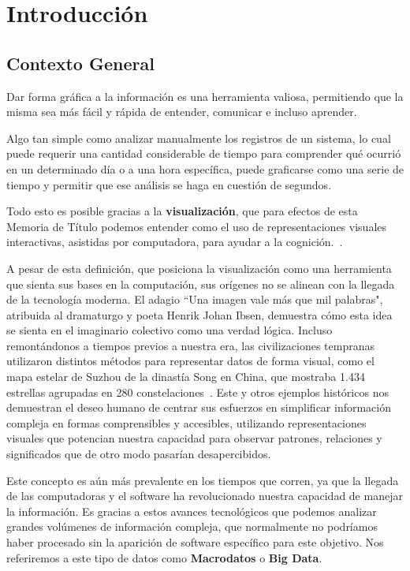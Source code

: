 \section{Introducción}
\subsection{Contexto General}

Dar forma gráfica a la información es una herramienta valiosa, permitiendo que la misma sea más fácil y rápida de entender, comunicar e incluso aprender. 

Algo tan simple como analizar manualmente los registros de un sistema, lo cual puede requerir una cantidad considerable de tiempo para comprender qué ocurrió en un determinado día o a una hora específica, puede graficarse como una serie de tiempo y permitir que ese análisis se haga en cuestión de segundos.

Todo esto es posible gracias a la \textbf{visualización}, que para efectos de esta Memoria de Título podemos entender como el uso de representaciones visuales interactivas, asistidas por computadora, para ayudar a la cognición.~\cite{card1999readings}. 

A pesar de esta definición, que posiciona la visualización como una herramienta que sienta sus bases en la computación, sus orígenes no se alinean con la llegada de la tecnología moderna. El adagio ``Una imagen vale más que mil palabras", atribuida al dramaturgo y poeta Henrik Johan Ibsen, demuestra cómo esta idea se sienta en el imaginario colectivo como una verdad lógica. Incluso remontándonos a tiempos previos a nuestra era, las civilizaciones tempranas utilizaron distintos métodos para representar datos de forma visual, como el mapa estelar de Suzhou de la dinastía Song en China, que mostraba 1.434 estrellas agrupadas en 280 constelaciones~\cite{bonnetbidaud2009dunhuang}. Este y otros ejemplos históricos nos demuestran el deseo humano de centrar sus esfuerzos en simplificar información compleja en formas comprensibles y accesibles, utilizando representaciones visuales que potencian nuestra capacidad para observar patrones, relaciones y significados que de otro modo pasarían desapercibidos.

Este concepto es aún más prevalente en los tiempos que corren, ya que la llegada de las computadoras y el software ha revolucionado nuestra capacidad de manejar la información. Es gracias a estos avances tecnológicos que podemos analizar grandes volúmenes de información compleja, que normalmente no podríamos haber procesado sin la aparición de software específico para este objetivo. Nos referiremos a este tipo de datos como \textbf{Macrodatos} o \textbf{Big Data}\cite{mcafee2012bigdata}.


